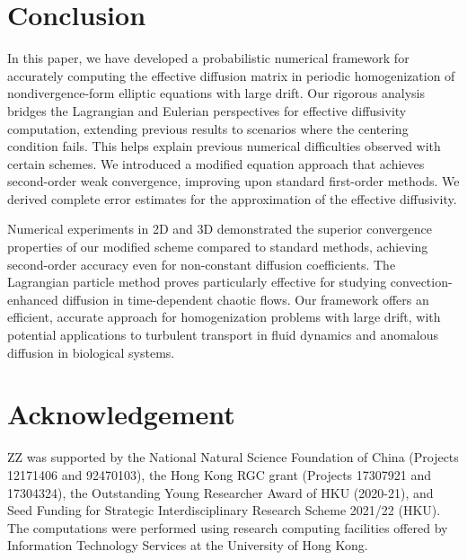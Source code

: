 \documentclass[12pt,a4paper,reqno]{amsart}
\numberwithin{equation}{section}
\begin{document}
\section{Conclusion}
\noindent
In this paper, we have developed a probabilistic numerical framework for accurately computing the effective diffusion matrix in periodic homogenization of nondivergence-form elliptic equations with large drift. Our rigorous analysis bridges the Lagrangian and Eulerian perspectives for effective diffusivity computation, extending previous results to scenarios where the centering condition fails.
This helps explain previous numerical difficulties observed with certain schemes. We introduced a modified equation approach that achieves second-order weak convergence, improving upon standard first-order methods. We derived complete error estimates for the approximation of the effective diffusivity. 

Numerical experiments in 2D and 3D demonstrated the superior convergence properties of our modified scheme compared to standard methods, achieving second-order accuracy even for non-constant diffusion coefficients. The Lagrangian particle method proves particularly effective for studying convection-enhanced diffusion in time-dependent chaotic flows. Our framework offers an efficient, accurate approach for homogenization problems with large drift, with potential applications to turbulent transport in fluid dynamics and anomalous diffusion in biological systems. 

\section*{Acknowledgement}
\noindent

ZZ was supported by the National Natural Science Foundation of China (Projects 12171406 and 92470103), the Hong Kong RGC grant (Projects 17307921 and 17304324), the Outstanding Young Researcher Award of HKU (2020-21), and Seed Funding for Strategic Interdisciplinary Research Scheme 2021/22 (HKU). The computations were performed using research computing facilities offered by Information Technology Services at the University of Hong Kong.



\end{document}
